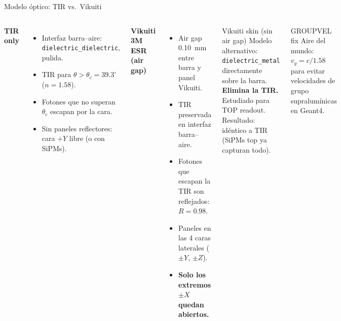 \documentclass[aspectratio=169,9pt]{beamer}
\begin{document}
\begin{frame}{Modelo \'optico: TIR vs.\ Vikuiti}
  \begin{columns}[T]
    \textbf{TIR only}
    \begin{itemize}
      \item Interfaz barra--aire: \texttt{dielectric\_dielectric}, pulida.
      \item TIR para $\theta > \theta_c = 39.3^\circ$ ($n=1.58$).
      \item Fotones que no superan $\theta_c$ \alert{escapan} por la cara.
      \item Sin paneles reflectores: cara $+Y$ libre (o con SiPMs).
    \end{itemize}

    \vspace{0.5em}
    \textbf{Vikuiti 3M ESR (air gap)}
    \begin{itemize}
      \item Air gap \SI{0.10}{mm} entre barra y panel Vikuiti.
      \item TIR preservada en interfaz barra--aire.
      \item Fotones que escapan la TIR son reflejados: $R = 0.98$.
      \item Paneles en las 4 caras laterales ($\pm Y$, $\pm Z$).
      \item \textbf{Solo los extremos $\pm X$ quedan abiertos.}
    \end{itemize}

    \begin{alertblock}{Vikuiti skin (sin air gap)}
      Modelo alternativo: \texttt{dielectric\_metal} directamente
      sobre la barra. \textbf{Elimina la TIR.} Estudiado para TOP readout.
      Resultado: id\'entico a TIR (SiPMs top ya capturan todo).
    \end{alertblock}
    \vspace{0.4em}
    \begin{block}{GROUPVEL fix}
      Aire del mundo: $v_g = c/1.58$ para evitar
      velocidades de grupo supralum\'inicas en Geant4.
    \end{block}
  \end{columns}
\end{frame}
\end{document}

